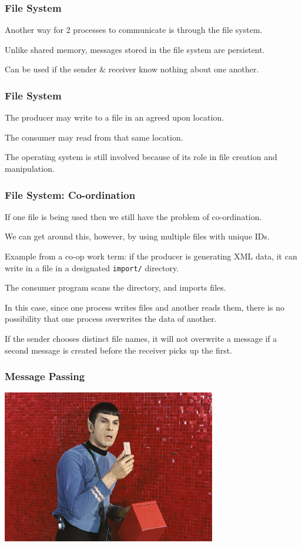 \begin{frame}
\frametitle{File System}

Another way for 2 processes to communicate is through the file system.

Unlike shared memory, messages stored in the file system are persistent. 

Can be used if the sender \& receiver know nothing about one another.

\end{frame}

\begin{frame}
\frametitle{File System}

The producer may write to a file in an agreed upon location.

The consumer may read from that same location.

The operating system is still involved because of its role in file creation and manipulation.

\end{frame}

\begin{frame}
\frametitle{File System: Co-ordination}

If one file is being used then we still have the problem of co-ordination.

We can get around this, however, by using multiple files with unique IDs. 

Example from a co-op work term: if the producer is generating XML data, it can write in a file in a designated \texttt{import/} directory. 

The consumer program scans the directory, and imports files.

In this case, since one process writes files and another reads them, there is no possibility that one process overwrites the data of another. 

If the sender chooses distinct file names, it will not overwrite a message if a second message is created before the receiver picks up the first.

\end{frame}


\begin{frame}
\frametitle{Message Passing}

\begin{center}
	\includegraphics[width=0.7\textwidth]{images/communicator.jpg}
\end{center}

\end{frame}


